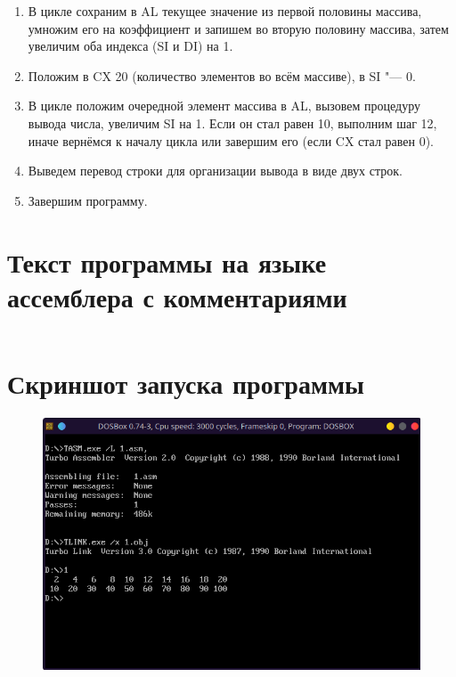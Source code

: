 \documentclass[bachelor, och, otchet]{../SCWorks}
\begin{document}
\begin{enumerate}
\item В цикле сохраним в AL текущее значение из первой половины массива, умножим его на коэффициент и запишем во вторую половину массива, затем увеличим оба индекса (SI и DI) на 1.
\item Положим в CX 20 (количество элементов во всём массиве), в SI "--- 0.
\item В цикле положим очередной элемент массива в AL, вызовем процедуру вывода числа, увеличим SI на 1. Если он стал равен 10, выполним шаг 12, иначе вернёмся к началу цикла или завершим его (если CX стал равен 0).
\item Выведем перевод строки для организации вывода в виде двух строк.
\item Завершим программу.
\end{enumerate}

\section{Текст программы на языке ассемблера с комментариями}
\small
\inputminted{nasm}{1.asm}
\normalsize

\section{Скриншот запуска программы}
\begin{figure}[H]
\centering
\includegraphics[scale=0.9]{1.png}
\end{figure}
\end{document}
